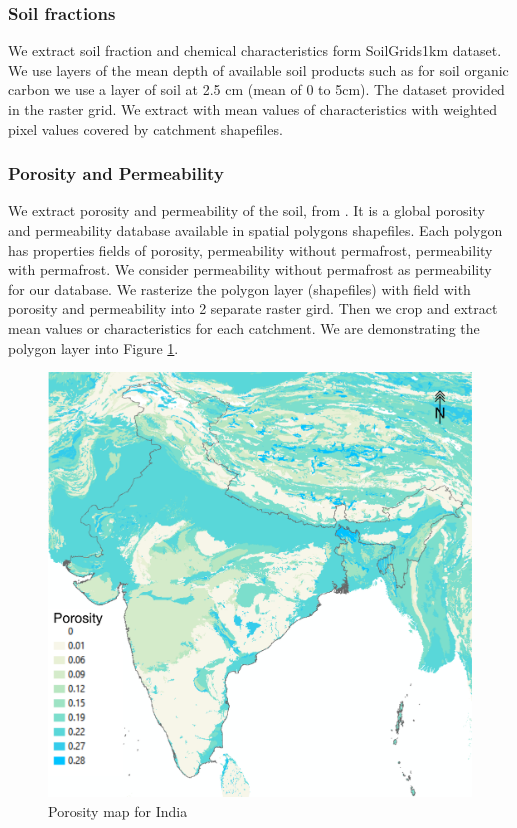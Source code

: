 \documentclass[a4paper, 12pt]{article}
\begin{document}
\subsubsection{Soil fractions} 
We extract soil fraction and chemical characteristics form SoilGrids1km dataset. We use layers of the mean depth of available soil products such as for soil organic carbon we use a layer of soil at 2.5 cm (mean of 0 to 5cm). The dataset provided in the raster grid. We extract with mean values of characteristics with weighted pixel values covered by catchment shapefiles. 
\subsubsection{Porosity and Permeability}
We extract porosity and permeability of the soil, from \citet{gleeson2014glimpse}. It is a global porosity and permeability database available in spatial polygons shapefiles. Each polygon has properties fields of porosity, permeability without permafrost, permeability with permafrost. We consider permeability without permafrost as permeability for our database. We rasterize the polygon layer (shapefiles) with field with porosity and permeability into 2 separate raster gird. Then we crop and extract mean values or characteristics for each catchment. We are demonstrating the polygon layer into Figure \ref{fig:PorPer}.
 
\begin{figure}[!h]
\includegraphics[width = 1\textwidth]{Figures/PorPer.png}
\caption{Porosity map for India}
\label{fig:PorPer}
\end{figure}
\end{document}
